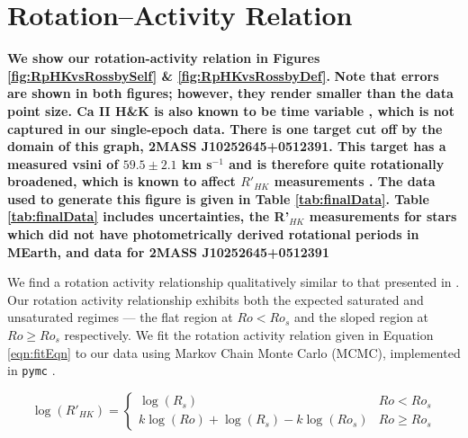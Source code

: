 \section{Rotation--Activity Relation}\label{sec:results}
\textbf{We show our rotation-activity relation in Figures
\ref{fig:RpHKvsRossbySelf} \& \ref{fig:RpHKvsRossbyDef}. }\textbf{Note that
errors are shown in both figures; however, they render smaller than the data
point size. Ca II H\&K is also known to be time variable
\citep[e.g.][]{Baroch2020,Perdelwitz2021}, which is not captured in our
single-epoch data. There is one target cut off by the domain of this graph,
2MASS J10252645+0512391. This target has a measured vsini of $59.5\pm2.1$ km
s$^{-1}$ \citep{Kesseli2018} and is therefore quite rotationally broadened, which
is known to affect $R'_{HK}$ measurements \citep[figure 8]{Schroder2009}. The
data used to generate this figure is given in Table \ref{tab:finalData}. Table
\ref{tab:finalData} includes uncertainties, the R'$_{HK}$ measurements for
stars which did not have photometrically derived rotational periods in MEarth,
and data for 2MASS J10252645+0512391}

We find a rotation activity relationship qualitatively similar to that
presented in \citet{Def17}. Our rotation activity relationship exhibits both
the expected saturated and unsaturated regimes --- the flat region at $Ro <
Ro_{s}$ and the sloped region at $Ro \geq Ro_{s}$ respectively. We fit the
rotation activity relation given in Equation \ref{eqn:fitEqn} to our data using
Markov Chain Monte Carlo (MCMC), implemented in \texttt{pymc}
\citep{Salvatier2016}. 

{\scriptsize
    \begin{equation}\label{eqn:fitEqn}
        \log(R'_{HK}) = \begin{cases}
            \log(R_{s}) & Ro < Ro_{s} \\
            k\log(Ro) + \log(R_{s}) - k\log(Ro_{s}) & Ro \geq Ro_{s}
        \end{cases}
    \end{equation}
}

